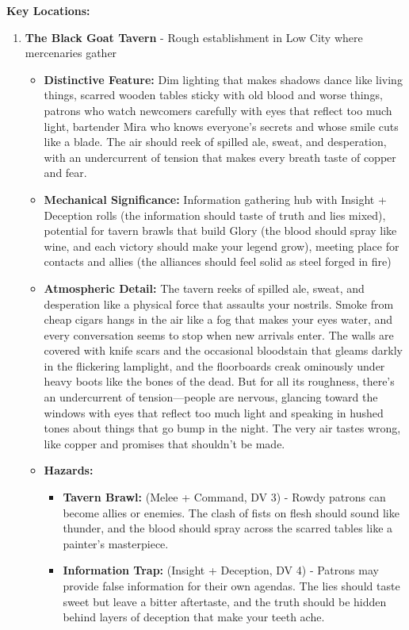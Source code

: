 \documentclass[11pt]{article}
\begin{document}
\textbf{Key Locations:}
\begin{enumerate}
\item \textbf{The Black Goat Tavern} - Rough establishment in Low City where mercenaries gather
  \begin{itemize}
  \item \textbf{Distinctive Feature:} Dim lighting that makes shadows dance like living things, scarred wooden tables sticky with old blood and worse things, patrons who watch newcomers carefully with eyes that reflect too much light, bartender Mira who knows everyone's secrets and whose smile cuts like a blade. The air should reek of spilled ale, sweat, and desperation, with an undercurrent of tension that makes every breath taste of copper and fear.
  \item \textbf{Mechanical Significance:} Information gathering hub with Insight + Deception rolls (the information should taste of truth and lies mixed), potential for tavern brawls that build Glory (the blood should spray like wine, and each victory should make your legend grow), meeting place for contacts and allies (the alliances should feel solid as steel forged in fire)
  \item \textbf{Atmospheric Detail:} The tavern reeks of spilled ale, sweat, and desperation like a physical force that assaults your nostrils. Smoke from cheap cigars hangs in the air like a fog that makes your eyes water, and every conversation seems to stop when new arrivals enter. The walls are covered with knife scars and the occasional bloodstain that gleams darkly in the flickering lamplight, and the floorboards creak ominously under heavy boots like the bones of the dead. But for all its roughness, there's an undercurrent of tension—people are nervous, glancing toward the windows with eyes that reflect too much light and speaking in hushed tones about things that go bump in the night. The very air tastes wrong, like copper and promises that shouldn't be made.
  \item \textbf{Hazards:}
    \begin{itemize}
    \item \textbf{Tavern Brawl:} (Melee + Command, DV 3) - Rowdy patrons can become allies or enemies. The clash of fists on flesh should sound like thunder, and the blood should spray across the scarred tables like a painter's masterpiece.
    \item \textbf{Information Trap:} (Insight + Deception, DV 4) - Patrons may provide false information for their own agendas. The lies should taste sweet but leave a bitter aftertaste, and the truth should be hidden behind layers of deception that make your teeth ache.

\end{itemize}
\end{itemize}
\end{enumerate}
\end{document}
